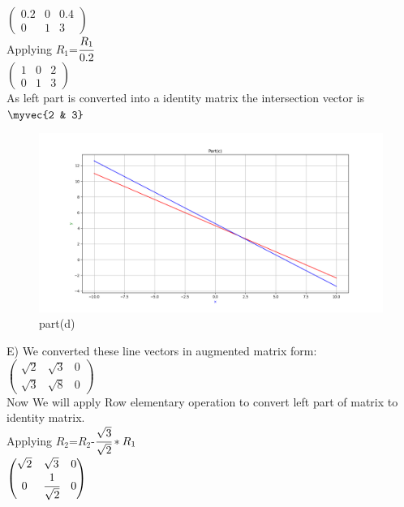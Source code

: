 $\begin{pmatrix}
0.2 & 0 & 0.4\\
0 & 1 & 3
\end{pmatrix}$\\

Applying $R_{1}$=$\cfrac{R_{1}}{0.2}$\\

$\begin{pmatrix}
1 & 0 & 2\\
0 & 1 & 3
\end{pmatrix}$\\

As left part is converted into a identity matrix the intersection vector is $\myvec{2 & 3}$\\

\renewcommand{\thefigure}{\theenumi.\arabic{figure}}
\begin{figure}[!ht]
    \centering
    \includegraphics[width=\columnwidth]{./figures/A1_partd}
\caption{part(d)}
\label{fig: part(d)}
\end{figure}

E)
We converted these line vectors in augmented matrix form:\\ 

$\begin{pmatrix}
\sqrt{2} & \sqrt{3} & 0\\
\sqrt{3} & \sqrt{8} & 0
\end{pmatrix}$\\
 

Now We will apply Row elementary operation to convert left part of matrix to identity matrix.\\

Applying $R_{2}$=$R_{2}$-$\cfrac{\sqrt{3}}{\sqrt{2}}*R_{1}$\\

$\begin{pmatrix}
\sqrt{2} & \sqrt{3} & 0\\
0 & \cfrac{1}{\sqrt{2}} & 0
\end{pmatrix}$\\

